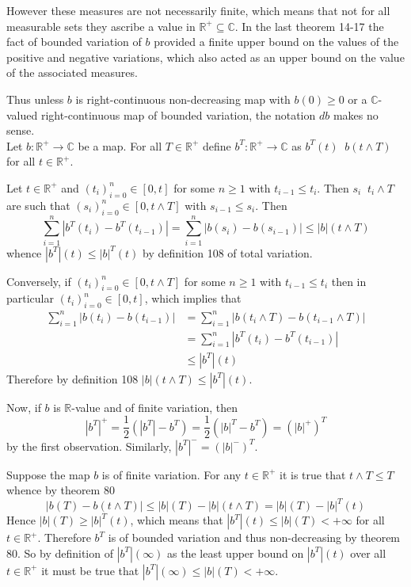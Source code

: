 \documentclass[a4paper]{article}
\newcommand{\clo}[1]{\left [ #1 \right ]}
\newcommand{\brac}[1]{\left ( #1 \right )}
\newcommand{\abs}[1]{\left | #1 \right |}
\newcommand{\Real}{\mathbb{R}}
\newcommand{\Cplx}{\mathbb{C}}
\newcommand{\defn}{\mathop{\overset{\Delta}{=}}\nolimits}
\begin{document}
However these measures are not necessarily finite, which means that not for all measurable sets they ascribe a value in $\Real^+\subseteq \Cplx$. In the last theorem 14-17 the fact of bounded variation of $b$ provided a finite upper bound on the values of the positive and negative variations, which also acted as an upper bound on the value of the associated measures.

Thus unless $b$ is right-continuous non-decreasing map with $b\brac{0}\geq 0$ or a $\Cplx$-valued right-continuous map of bounded variation, the notation $db$ makes no sense.\\

Let $b:\Real^+\to\Cplx$ be a map. For all $T\in \Real^+$ define $b^T:\Real^+\to\Cplx$ as $b^T\brac{t}\defn b\brac{t\wedge T}$ for all $t\in\Real^+$.

Let $t\in \Real^+$ and $\brac{t_i}_{i=0}^n\in \clo{0,t}$ for some $n\geq1$ with $t_{i-1}\leq t_i$. Then $s_i\defn t_i\wedge T$ are such that $\brac{s_i}_{i=0}^n\in \clo{0,t\wedge T}$ with $s_{i-1}\leq s_i$. Then \[\sum_{i=1}^n\abs{b^T\brac{t_i}-b^T\brac{t_{i-1}}} = \sum_{i=1}^n\abs{b\brac{s_i}-b\brac{s_{i-1}}}\leq \abs{b}\brac{t\wedge T}\] whence $\abs{b^T}\brac{t}\leq \abs{b}^T\brac{t}$ by definition 108 of total variation.

Conversely, if $\brac{t_i}_{i=0}^n\in \clo{0,t\wedge T}$ for some $n\geq1$ with $t_{i-1}\leq t_i$ then in particular $\brac{t_i}_{i=0}^n\in \clo{0,t}$, which implies that \begin{align*}\sum_{i=1}^n\abs{b\brac{t_i}-b\brac{t_{i-1}}} &= \sum_{i=1}^n\abs{b\brac{t_i\wedge T}-b\brac{t_{i-1}\wedge T}} \\&= \sum_{i=1}^n\abs{b^T\brac{t_i}-b^T\brac{t_{i-1}}}\\&\leq \abs{b^T}\brac{t}\end{align*} Therefore by definition 108 $\abs{b}\brac{t\wedge T}\leq \abs{b^T}\brac{t}$.

Now, if $b$ is $\Real$-value and of finite variation, then \[\abs{b^T}^+ = \frac{1}{2}\brac{\abs{b^T}-b^T} = \frac{1}{2}\brac{\abs{b}^T-b^T} = \brac{\abs{b}^+}^T\] by the first observation. Similarly, $\abs{b^T}^-=\brac{\abs{b}^-}^T$.

Suppose the map $b$ is of finite variation. For any $t\in \Real^+$ it is true that $t\wedge T\leq T$ whence by theorem 80 \[\abs{b\brac{T}-b\brac{t\wedge T}}\leq \abs{b}\brac{T}-\abs{b}\brac{t\wedge T} = \abs{b}\brac{T}-\abs{b}^T\brac{t}\] Hence $\abs{b}\brac{T}\geq \abs{b}^T\brac{t}$, which means that $\abs{b^T}\brac{t}\leq \abs{b}\brac{T}<+\infty$ for all $t\in \Real^+$. Therefore $b^T$ is of bounded variation and thus non-decreasing by theorem 80. So by definition of $\abs{b^T}\brac{\infty}$ as the least upper bound on $\abs{b^T}\brac{t}$ over all $t\in \Real^+$ it must be true that $\abs{b^T}\brac{\infty}\leq \abs{b}\brac{T}<+\infty$.
\end{document}
